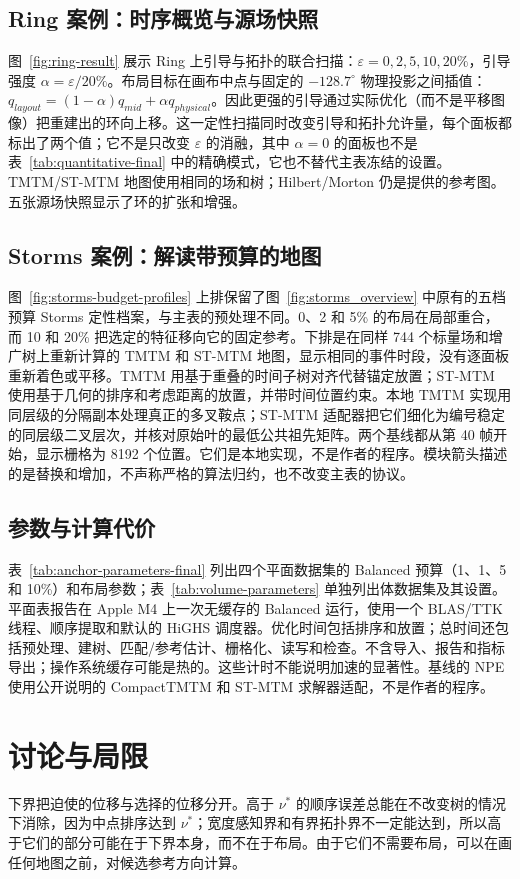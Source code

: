 \documentclass[fontset=none,zihao=5,a4paper]{ctexart}
\begin{document}
\subsection{Ring 案例：时序概览与源场快照}
图~\ref{fig:ring-result} 展示 Ring 上引导与拓扑的联合扫描：$\varepsilon=0,2,5,10,20\%$，引导强度 $\alpha=\varepsilon/20\%$。布局目标在画布中点与固定的 $-128.7^\circ$ 物理投影之间插值：$q_{layout}=(1-\alpha)q_{mid}+\alpha q_{physical}$。因此更强的引导通过实际优化（而不是平移图像）把重建出的环向上移。这一定性扫描同时改变引导和拓扑允许量，每个面板都标出了两个值；它不是只改变 $\varepsilon$ 的消融，其中 $\alpha=0$ 的面板也不是表~\ref{tab:quantitative-final} 中的精确模式，它也不替代主表冻结的设置。TMTM/ST-MTM 地图使用相同的场和树；Hilbert/Morton 仍是提供的参考图。五张源场快照显示了环的扩张和增强。

\subsection{Storms 案例：解读带预算的地图}
图~\ref{fig:storms-budget-profiles} 上排保留了图~\ref{fig:storms_overview} 中原有的五档预算 Storms 定性档案，与主表的预处理不同。0、2 和 5\% 的布局在局部重合，而 10 和 20\% 把选定的特征移向它的固定参考。下排是在同样 744 个标量场和增广树上重新计算的 TMTM 和 ST-MTM 地图，显示相同的事件时段，没有逐面板重新着色或平移。TMTM 用基于重叠的时间子树对齐代替锚定放置；ST-MTM 使用基于几何的排序和考虑距离的放置，并带时间位置约束。本地 TMTM 实现用同层级的分隔副本处理真正的多叉鞍点；ST-MTM 适配器把它们细化为编号稳定的同层级二叉层次，并核对原始叶的最低公共祖先矩阵。两个基线都从第 40 帧开始，显示栅格为 8192 个位置。它们是本地实现，不是作者的程序。模块箭头描述的是替换和增加，不声称严格的算法归约，也不改变主表的协议。

\subsection{参数与计算代价}
表~\ref{tab:anchor-parameters-final} 列出四个平面数据集的 Balanced 预算（1、1、5 和 10\%）和布局参数；表~\ref{tab:volume-parameters} 单独列出体数据集及其设置。平面表报告在 Apple M4 上一次无缓存的 Balanced 运行，使用一个 BLAS/TTK 线程、顺序提取和默认的 HiGHS 调度器。优化时间包括排序和放置；总时间还包括预处理、建树、匹配/参考估计、栅格化、读写和检查。不含导入、报告和指标导出；操作系统缓存可能是热的。这些计时不能说明加速的显著性。基线的 NPE 使用公开说明的 CompactTMTM 和 ST-MTM 求解器适配，不是作者的程序。

\section{讨论与局限}
下界把迫使的位移与选择的位移分开。高于 $\nu^*$ 的顺序误差总能在不改变树的情况下消除，因为中点排序达到 $\nu^*$；宽度感知界和有界拓扑界不一定能达到，所以高于它们的部分可能在于下界本身，而不在于布局。由于它们不需要布局，可以在画任何地图之前，对候选参考方向计算。
\end{document}
